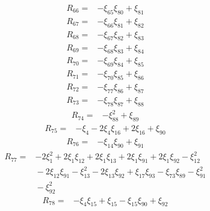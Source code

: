 \[
\begin{aligned}
 R_{66}={}&-\xi_{65}\xi_{80}+\xi_{81}
\end{aligned}
\]
\[
\begin{aligned}
 R_{67}={}&-\xi_{66}\xi_{81}+\xi_{82}
\end{aligned}
\]
\[
\begin{aligned}
 R_{68}={}&-\xi_{67}\xi_{82}+\xi_{83}
\end{aligned}
\]
\[
\begin{aligned}
 R_{69}={}&-\xi_{68}\xi_{83}+\xi_{84}
\end{aligned}
\]
\[
\begin{aligned}
 R_{70}={}&-\xi_{69}\xi_{84}+\xi_{85}
\end{aligned}
\]
\[
\begin{aligned}
 R_{71}={}&-\xi_{70}\xi_{85}+\xi_{86}
\end{aligned}
\]
\[
\begin{aligned}
 R_{72}={}&-\xi_{77}\xi_{86}+\xi_{87}
\end{aligned}
\]
\[
\begin{aligned}
 R_{73}={}&-\xi_{78}\xi_{87}+\xi_{88}
\end{aligned}
\]
\[
\begin{aligned}
 R_{74}={}&-\xi_{88}^{2}+\xi_{89}
\end{aligned}
\]
\[
\begin{aligned}
 R_{75}={}&-\xi_{4}-2\xi_{4}\xi_{16}+2\xi_{16}+\xi_{90}
\end{aligned}
\]
\[
\begin{aligned}
 R_{76}={}&-\xi_{14}\xi_{90}+\xi_{91}
\end{aligned}
\]
\[
\begin{aligned}
 R_{77}={}&-2\xi_{1}^{2}+2\xi_{1}\xi_{12}+2\xi_{1}\xi_{13}+2\xi_{1}\xi_{91}+2\xi_{1}\xi_{92}-\xi_{12}^{2}\\
 &{}-2\xi_{12}\xi_{91}-\xi_{13}^{2}-2\xi_{13}\xi_{92}+\xi_{17}\xi_{93}-\xi_{73}\xi_{89}-\xi_{91}^{2}\\
 &{}-\xi_{92}^{2}
\end{aligned}
\]
\[
\begin{aligned}
 R_{78}={}&-\xi_{4}\xi_{15}+\xi_{15}-\xi_{15}\xi_{90}+\xi_{92}
\end{aligned}
\]
